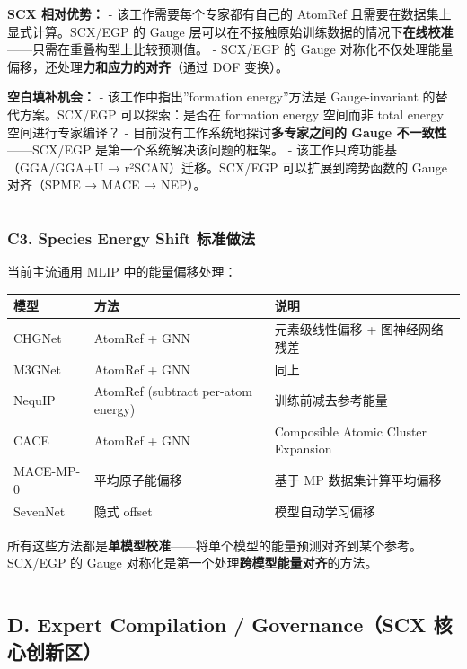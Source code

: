 \documentclass[
  12pt,
]{ctexart}
\begin{document}
\textbf{SCX 相对优势：} - 该工作需要每个专家都有自己的 AtomRef
且需要在数据集上显式计算。SCX/EGP 的 Gauge
层可以在不接触原始训练数据的情况下\textbf{在线校准}------只需在重叠构型上比较预测值。
- SCX/EGP 的 Gauge
对称化不仅处理能量偏移，还处理\textbf{力和应力的对齐}（通过 DOF 变换）。

\textbf{空白填补机会：} - 该工作中指出''formation energy''方法是
Gauge-invariant 的替代方案。SCX/EGP 可以探索：是否在 formation energy
空间而非 total energy 空间进行专家编译？ -
目前没有工作系统地探讨\textbf{多专家之间的 Gauge 不一致性}------SCX/EGP
是第一个系统解决该问题的框架。 - 该工作只跨功能基（GGA/GGA+U →
r²SCAN）迁移。SCX/EGP 可以扩展到跨势函数的 Gauge 对齐（SPME → MACE →
NEP）。

\begin{center}\rule{0.5\linewidth}{0.5pt}\end{center}

\subsubsection{C3. Species Energy Shift
标准做法}\label{c3.-species-energy-shift-ux6807ux51c6ux505aux6cd5}

当前主流通用 MLIP 中的能量偏移处理：

\begin{longtable}[]{@{}lll@{}}
\toprule\noalign{}
模型 & 方法 & 说明 \\
\midrule\noalign{}
\endhead
\bottomrule\noalign{}
\endlastfoot
CHGNet & AtomRef + GNN & 元素级线性偏移 + 图神经网络残差 \\
M3GNet & AtomRef + GNN & 同上 \\
NequIP & AtomRef (subtract per-atom energy) & 训练前减去参考能量 \\
CACE & AtomRef + GNN & Composible Atomic Cluster Expansion \\
MACE-MP-0 & 平均原子能偏移 & 基于 MP 数据集计算平均偏移 \\
SevenNet & 隐式 offset & 模型自动学习偏移 \\
\end{longtable}

所有这些方法都是\textbf{单模型校准}------将单个模型的能量预测对齐到某个参考。SCX/EGP
的 Gauge 对称化是第一个处理\textbf{跨模型能量对齐}的方法。

\begin{center}\rule{0.5\linewidth}{0.5pt}\end{center}

\subsection{D. Expert Compilation / Governance（SCX
核心创新区）}\label{d.-expert-compilation-governancescx-ux6838ux5fc3ux521bux65b0ux533a}
\end{document}
